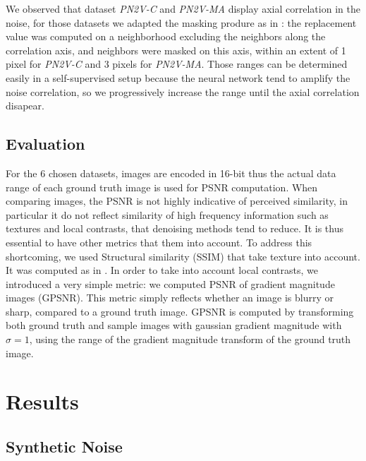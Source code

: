 \documentclass{article}
\begin{document}
We observed that dataset \emph{PN2V-C} and \emph{PN2V-MA} display axial correlation in the noise, for those datasets we adapted the masking produre as in \cite{broaddus2020removing}: the replacement value was computed on a neighborhood excluding the neighbors along the correlation axis, and neighbors were masked on this axis, within an extent of 1 pixel for \emph{PN2V-C} and 3 pixels for \emph{PN2V-MA}. Those ranges can be determined easily in a self-supervised setup because the neural network tend to amplify the noise correlation, so we progressively increase the range until the axial correlation disapear.


\subsection{Evaluation}
For the 6 chosen datasets, images are encoded in 16-bit thus the actual data range of each ground truth image is used for PSNR computation.
When comparing images, the PSNR is not highly indicative of perceived similarity, in particular it do not reflect similarity of high frequency information such as textures and local contrasts\cite{wang2004image}, that denoising methods tend to reduce. It is thus essential to have other metrics that them into account.
To address this shortcoming, we used Structural similarity (SSIM) that take texture into account. It was computed as in \cite{wang2004image}.
In order to take into account local contrasts, we introduced a very simple metric: we computed PSNR of gradient magnitude images (GPSNR). This metric simply reflects whether an image is blurry or sharp, compared to a ground truth image.
GPSNR is computed by transforming both ground truth and sample images with gaussian gradient magnitude with $\sigma=1$, using the range of the gradient magnitude transform of the ground truth image.

\section{Results}
\subsection{Synthetic Noise}
\end{document}
